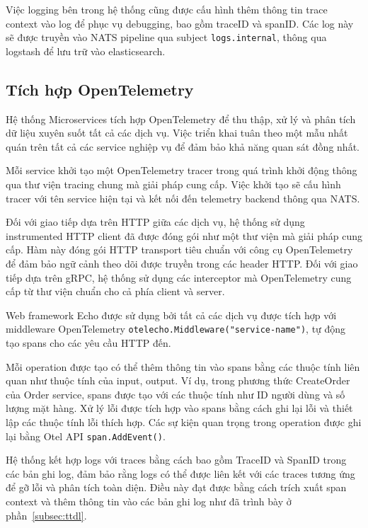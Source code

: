 \documentclass{uetgraduation}
\begin{document}
Việc logging bên trong hệ thống cũng được cấu hình thêm thông tin trace context vào log để phục vụ debugging, bao gồm traceID và spanID. Các log này sẽ được truyền vào NATS pipeline qua subject \texttt{logs.internal}, thông qua logstash để lưu trữ vào elasticsearch.

\subsection{Tích hợp OpenTelemetry}

Hệ thống Microservices tích hợp OpenTelemetry để thu thập, xử lý và phân tích dữ liệu xuyên suốt tất cả các dịch vụ. Việc triển khai tuân theo một mẫu nhất quán trên tất cả các service nghiệp vụ để đảm bảo khả năng quan sát đồng nhất.

Mỗi service khởi tạo một OpenTelemetry tracer trong quá trình khởi động thông qua thư viện tracing chung mà giải pháp cung cấp. Việc khởi tạo sẽ cấu hình tracer với tên service hiện tại và kết nối đến telemetry backend thông qua NATS.

Đối với giao tiếp dựa trên HTTP giữa các dịch vụ, hệ thống sử dụng instrumented HTTP client đã được đóng gói như một thư viện mà giải pháp cung cấp. Hàm này đóng gói HTTP transport tiêu chuẩn với công cụ OpenTelemetry để đảm bảo ngữ cảnh theo dõi được truyền trong các header HTTP. Đối với giao tiếp dựa trên gRPC, hệ thống sử dụng các interceptor mà OpenTelemetry cung cấp từ thư viện chuẩn cho cả phía client và server.

Web framework Echo được sử dụng bởi tất cả các dịch vụ được tích hợp với middleware OpenTelemetry \texttt{otelecho.Middleware("service-name")}, tự động tạo spans cho các yêu cầu HTTP đến.

Mỗi operation được tạo có thể thêm thông tin vào spans bằng các thuộc tính liên quan như thuộc tính của input, output. Ví dụ, trong phương thức CreateOrder của Order service, spans được tạo với các thuộc tính như ID người dùng và số lượng mặt hàng. Xử lý lỗi được tích hợp vào spans bằng cách ghi lại lỗi và thiết lập các thuộc tính lỗi thích hợp. Các sự kiện quan trọng trong operation được ghi lại bằng Otel API \texttt{span.AddEvent()}.

Hệ thống kết hợp logs với traces bằng cách bao gồm TraceID và SpanID trong các bản ghi log, đảm bảo rằng logs có thể được liên kết với các traces tương ứng để gỡ lỗi và phân tích toàn diện. Điều này đạt được bằng cách trích xuất span context và thêm thông tin vào các bản ghi log như đã trình bày ở phần~\ref{subsec:ttdl}.
\end{document}
